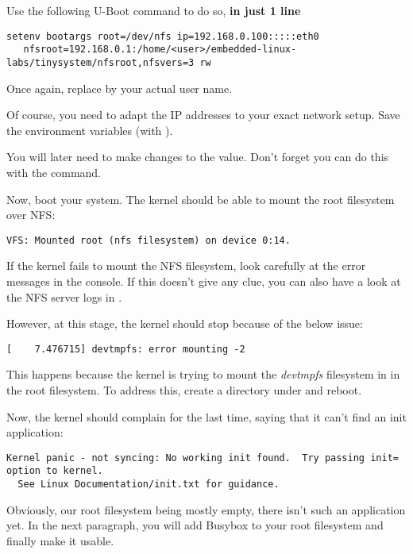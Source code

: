 Use the following U-Boot command to do so, {\bf in just 1 line}

\begin{verbatim}
setenv bootargs root=/dev/nfs ip=192.168.0.100:::::eth0
   nfsroot=192.168.0.1:/home/<user>/embedded-linux-labs/tinysystem/nfsroot,nfsvers=3 rw
\end{verbatim}

Once again, replace  by your actual user name.

Of course, you need to adapt the IP addresses to your exact network
setup. Save the environment variables (with ).

You will later need to make changes to the  value.
Don't forget you can do this with the  command.

Now, boot your system. The kernel should be able to mount the root
filesystem over NFS:

\begin{verbatim}
VFS: Mounted root (nfs filesystem) on device 0:14.
\end{verbatim}

If the kernel fails to mount the NFS filesystem, look carefully at the
error messages in the console. If this doesn't give any clue, you can
also have a look at the NFS server logs in .

However, at this stage, the kernel should stop because of the below
issue:

\begin{verbatim}
[    7.476715] devtmpfs: error mounting -2
\end{verbatim}

This happens because the kernel is trying to mount the {\em devtmpfs}
filesystem in  in the root filesystem. To address this,
create a  directory under  and reboot.

Now, the kernel should complain for the last time, saying that it can't
find an init application:

\footnotesize
\begin{verbatim}
Kernel panic - not syncing: No working init found.  Try passing init= option to kernel.
  See Linux Documentation/init.txt for guidance.
\end{verbatim}
\normalsize

Obviously, our root filesystem being mostly empty, there isn't such an
application yet. In the next paragraph, you will add Busybox to your root
filesystem and finally make it usable.

